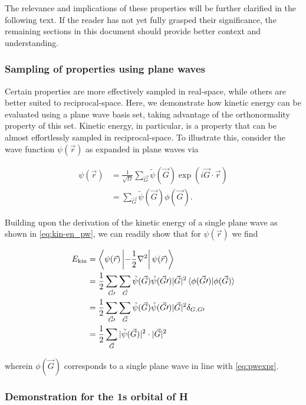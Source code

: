 The relevance and implications of these properties will be further clarified in the following text. If the reader has not yet fully grasped their significance, the remaining sections in this document should provide better context and understanding.

%
%
%
\subsubsection{Sampling of properties using plane waves}

Certain properties are more effectively sampled in real-space, while others are better suited to reciprocal-space. Here, we demonstrate how kinetic energy can be evaluated using a plane wave basis set, taking advantage of the orthonormality property of this set. Kinetic energy, in particular, is a property that can be almost effortlessly sampled in reciprocal-space. To illustrate this, consider the wave function $\psi(\vec{r})$ as expanded in plane waves via

\begin{align}
    \psi(\vec{r}) &= \frac{1}{\sqrt{\Omega}} \sum_{\vec{G}} \tilde{\psi}(\vec{G}) \exp \left(i \vec{G} \cdot \vec{r} \right) \\
    &= \sum_{\vec{G}} \tilde{\psi}(\vec{G}) \phi(\vec{G}).
\end{align}

Building upon the derivation of the kinetic energy of a single plane wave as shown in \cref{eq:kin-en_pw}, we can readily show that for $\psi(\vec{r})$ we find

\begin{align}
    E_{\text{kin}} &= \left<\psi(\vec{r})\left|-\frac{1}{2}\nabla^{2}\right|\psi(\vec{r})\right> \\
    &= \frac{1}{2} \sum_{\vec{G}\prime}\sum_{\vec{G}} \tilde{\psi}(\vec{G}) \tilde{\psi}(\vec{G}\prime) |\vec{G}|^{2} \braket{\phi(\vec{G}\prime)|\phi(\vec{G})} \\
    &= \frac{1}{2} \sum_{\vec{G}\prime}\sum_{\vec{G}} \tilde{\psi}(\vec{G}) \tilde{\psi}(\vec{G}\prime) |\vec{G}|^{2} \delta_{G,G\prime} \\
    &=\frac{1}{2}\sum_{\vec{G}} |\tilde{\psi}(\vec{G})|^{2} \cdot |\vec{G}|^{2}
\end{align}

wherein $\phi(\vec{G})$ corresponds to a single plane wave in line with \cref{eq:pwexpr}.

%
%
%
\subsubsection{Demonstration for the 1s orbital of H}

